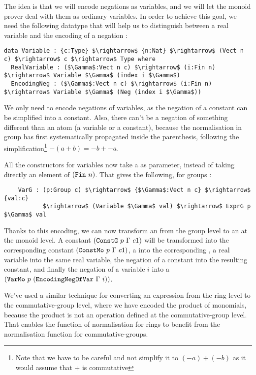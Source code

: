 The idea is that we will encode negations as variables, and we will let the monoid prover deal with them as ordinary variables. In order to achieve this goal, we need the following datatype that will help us to distinguish between a real variable and the encoding of a negation :

\begin{lstlisting}
data Variable : {c:Type} $\rightarrow$ {n:Nat} $\rightarrow$ (Vect n c) $\rightarrow$ c $\rightarrow$ Type where
  RealVariable : ($\Gamma$:Vect n c) $\rightarrow$ (i:Fin n) $\rightarrow$ Variable $\Gamma$ (index i $\Gamma$)
  EncodingNeg : ($\Gamma$:Vect n c) $\rightarrow$ (i:Fin n) $\rightarrow$ Variable $\Gamma$ (Neg (index i $\Gamma$))
\end{lstlisting}

We only need to encode negations of variables, as the negation of a constant can be simplified into a constant. Also, there can't be a negation of something different than an atom (a variable or a constant), because the normalisation in group has first systematically propagated  inside the parenthesis, following the simplification\footnote{Note that we have to be careful and not simplify it to $(-a) + (-b)$ as it would assume that $+$ is commutative} $-(a+b) = -b + -a$.

All the constructors for variables now take a  as parameter, instead of taking directly an element of $(\code{Fin}\ n)$. That gives the following, for groups :

\begin{lstlisting}
    VarG : (p:Group c) $\rightarrow$ {$\Gamma$:Vect n c} $\rightarrow$ {val:c} 
           $\rightarrow$ (Variable $\Gamma$ val) $\rightarrow$ ExprG p $\Gamma$ val
\end{lstlisting}


Thanks to this encoding, we can now transform an  from the group level to an  at the monoid level. A constant $({\mbox{\texttt{ConstG}}}\ p\ \Gamma\ c1)$ will be transformed into the corresponding constant $({\mbox{\texttt{ConstMo}}}\ p\ \Gamma\ c1)$, a  into the corresponding , a real variable into the same real variable, the negation of a constant into the resulting constant, and finally the negation of a variable $i$ into a $(\code{VarMo}\ p\ (\code{EncodingNegOfVar}\ \Gamma\ i))$.

We've used a similar technique for converting an expression from the ring level to the commutative-group level, where we have encoded the product of monomials, because the product is not an operation defined at the commutative-group level. That enables the function of normalisation for rings to benefit from the normalisation function for commutative-groups.


